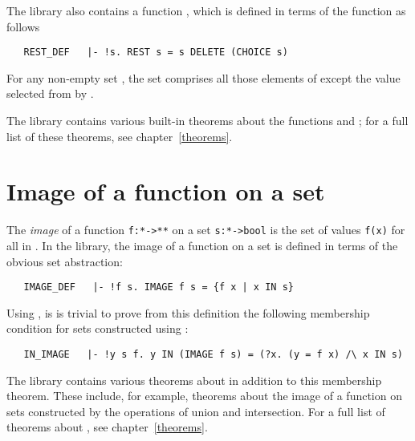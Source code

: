 The library also contains a function , which is defined in terms of
the  function as follows

\begin{hol}
\begin{verbatim}
   REST_DEF   |- !s. REST s = s DELETE (CHOICE s)
\end{verbatim}\end{hol}

\noindent For any non-empty set , the set  comprises all those
elements of  except the value selected from  by .

The library contains various built-in theorems about the functions 
and ; for a full list of these theorems, see chapter~\ref{theorems}.

\section{Image of a function on a set}

The {\it image\/} of a function {\small\verb!f:*->**!} on a set
{\small\verb!s:*->bool!} is the set of values {\small\verb!f(x)!} for all
 in .  In the  library, the image of a function on a
set is defined in terms of the obvious set abstraction:

\begin{hol}
\begin{verbatim}
   IMAGE_DEF   |- !f s. IMAGE f s = {f x | x IN s}
\end{verbatim}\end{hol}

\noindent Using , is is trivial to prove from this
definition the following membership condition for sets constructed using
:

\begin{hol}
\begin{verbatim}
   IN_IMAGE   |- !y s f. y IN (IMAGE f s) = (?x. (y = f x) /\ x IN s)
\end{verbatim}\end{hol}

\noindent The  library contains various theorems about
 in addition to this membership theorem.  These include, for example,
theorems about the image of a function on sets constructed by the operations of
union and intersection.  For a full list of theorems about , see
chapter~\ref{theorems}.

